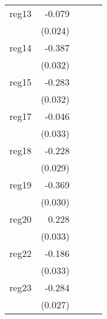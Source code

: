 {\begin{longtable}{l*{4}{D{.}{.}{-1}}}
\addlinespace
reg13       &      -0.079\sym{***}&                     &                     &                     \\
            &     (0.024)         &                     &                     &                     \\
\addlinespace
reg14       &      -0.387\sym{***}&                     &                     &                     \\
            &     (0.032)         &                     &                     &                     \\
\addlinespace
reg15       &      -0.283\sym{***}&                     &                     &                     \\
            &     (0.032)         &                     &                     &                     \\
\addlinespace
reg17       &      -0.046         &                     &                     &                     \\
            &     (0.033)         &                     &                     &                     \\
\addlinespace
reg18       &      -0.228\sym{***}&                     &                     &                     \\
            &     (0.029)         &                     &                     &                     \\
\addlinespace
reg19       &      -0.369\sym{***}&                     &                     &                     \\
            &     (0.030)         &                     &                     &                     \\
\addlinespace
reg20       &       0.228\sym{***}&                     &                     &                     \\
            &     (0.033)         &                     &                     &                     \\
\addlinespace
reg22       &      -0.186\sym{***}&                     &                     &                     \\
            &     (0.033)         &                     &                     &                     \\
\addlinespace
reg23       &      -0.284\sym{***}&                     &                     &                     \\
            &     (0.027)         &                     &                     &                     \\

\end{longtable}}
